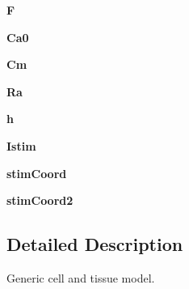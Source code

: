 \begin{DoxyCompactItemize}
\item 
\hypertarget{classcell__mdl2_1_1_tissue_model_a1fd406685cbdee605d0a7bebed56fdb0}{
{\bfseries F}}
\label{classcell__mdl2_1_1_tissue_model_a1fd406685cbdee605d0a7bebed56fdb0}

\item 
\hypertarget{classcell__mdl2_1_1_tissue_model_af661914709c6004535c3e6eb4f8141ac}{
{\bfseries Ca0}}
\label{classcell__mdl2_1_1_tissue_model_af661914709c6004535c3e6eb4f8141ac}

\item 
\hypertarget{classcell__mdl2_1_1_tissue_model_af15c4e8e76b19dde1854faff5a5e16f4}{
{\bfseries Cm}}
\label{classcell__mdl2_1_1_tissue_model_af15c4e8e76b19dde1854faff5a5e16f4}

\item 
\hypertarget{classcell__mdl2_1_1_tissue_model_ade9b4a16f72e6c1b3b656cb70df506ef}{
{\bfseries Ra}}
\label{classcell__mdl2_1_1_tissue_model_ade9b4a16f72e6c1b3b656cb70df506ef}

\item 
\hypertarget{classcell__mdl2_1_1_tissue_model_a5e36941b3d856737e81516acd45edc50}{
{\bfseries h}}
\label{classcell__mdl2_1_1_tissue_model_a5e36941b3d856737e81516acd45edc50}

\item 
\hypertarget{classcell__mdl2_1_1_tissue_model_a972fec403b21409d11e60fa97774c1df}{
{\bfseries Istim}}
\label{classcell__mdl2_1_1_tissue_model_a972fec403b21409d11e60fa97774c1df}

\item 
\hypertarget{classcell__mdl2_1_1_tissue_model_a605a801f12570f50328e5be6529fb0e7}{
{\bfseries stimCoord}}
\label{classcell__mdl2_1_1_tissue_model_a605a801f12570f50328e5be6529fb0e7}

\item 
\hypertarget{classcell__mdl2_1_1_tissue_model_aae3492faf67f9d6d694decf872b47ab9}{
{\bfseries stimCoord2}}
\label{classcell__mdl2_1_1_tissue_model_aae3492faf67f9d6d694decf872b47ab9}

\end{DoxyCompactItemize}


\subsection{Detailed Description}
\begin{DoxyVerb}Generic cell and tissue model.\end{DoxyVerb}
 

